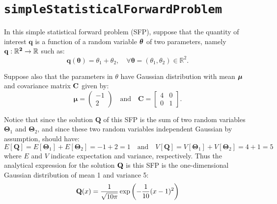 \section{\texttt{simpleStatisticalForwardProblem}}\label{sec:example_sfp}

In this simple statistical forward problem (SFP), suppose that the quantity of interest $\mathbf{q}$ is a function of a random variable $\mbox{\boldmath$ \theta $}$ of two parameters, namely $\bf{q}:\mathbb{R}^2\rightarrow\mathbb{R}$ such as:
\begin{equation}\label{eq-example-q}
\mathbf{q}(\boldsymbol{\theta}) = \theta_1+\theta_2,\quad\forall\boldsymbol{\theta}=(\theta_1,\theta_2)\in\mathbb{R}^2.
\end{equation}

Suppose also that the parameters in $\theta$ have Gaussian distribution with mean $\mbox{\boldmath$ \mu $}$ and covariance matrix $\bf{C}$ given by:
\begin{equation}\label{eq-example-mu-sfp}
\boldsymbol{\mu} = 
\left(\begin{array}{c}
-1 \\
2
\end{array}\right)
\quad
\text{and}
\quad
\mathbf{C} = 
\left[\begin{array}{cc}
4 & 0 \\
0 & 1
\end{array}\right].
\end{equation}


Notice that since the solution $\mathbf{Q}$ of this SFP is the sum of two random variables $\boldsymbol{\Theta}_1$ and $\boldsymbol{\Theta}_2$, and since these two random variables independent Gaussian by assumption, should have:
\begin{equation}\label{eq-example-E-V}
E[\mathbf{Q}] = E[\boldsymbol{\Theta}_1] + E[\boldsymbol{\Theta}_2] = -1 + 2 = 1 \quad \text{and} \quad
%
V[\mathbf{Q}] = V[\boldsymbol{\Theta}_1] + V[\boldsymbol{\Theta}_2] = 4 + 1 = 5
\end{equation}
where $E$ and $V$ indicate expectation and variance, respectively. Thus the analytical expression for the solution $\bf{Q}$ is this SFP is the one-dimensional Gaussian distribution of mean 1 and variance 5:
\begin{equation}\label{eq-example-sfp-analytical}
{\bf Q}(x)=   \frac{1}{ \sqrt{10\pi}} \exp\left(-\frac{1}{10}(x-1)^2 \right)
\end{equation}



